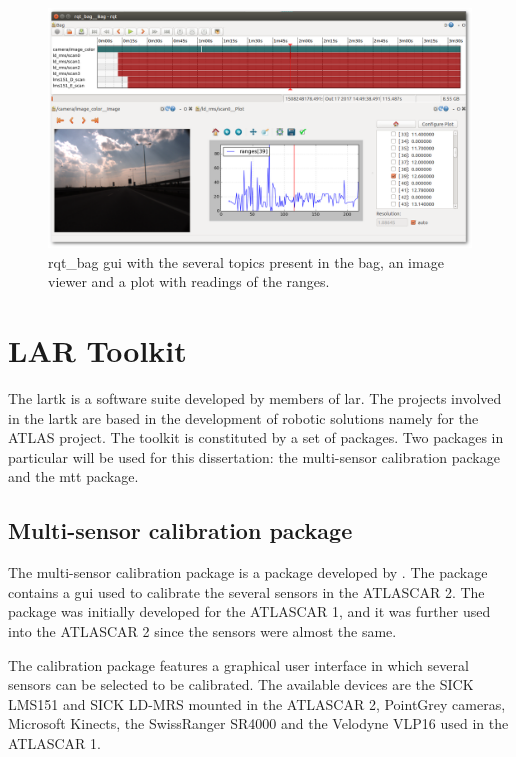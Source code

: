 \begin{figure}[htp]
	\centering
	\includegraphics[width=.99\textwidth]{capexp/imgs/rqt_bag.png}
	\caption{rqt\_bag \gls{gui} with the several topics present in the bag, an image viewer and a plot with readings of the ranges.}
	\label{fig:rqtbag}
\end{figure}


\section{LAR Toolkit}

The \gls{lartk} is a software suite developed by members of \gls{lar}. The projects involved in the \gls{lartk} are based in the development of robotic solutions namely for the ATLAS project. The toolkit is constituted by a set of packages. Two packages in particular will be used for this dissertation: the multi-sensor calibration package and the \gls{mtt} package.

\subsection{Multi-sensor calibration package}

The multi-sensor calibration package is a package developed by \cite{VieiradaSilva2016}. The package contains a \gls{gui} used to calibrate the several sensors in the ATLASCAR 2. The package was initially developed for the ATLASCAR 1, and it was further used into the ATLASCAR 2 since the sensors were almost the same.

The calibration package features a graphical user interface in which several sensors can be selected to be calibrated. The available devices are the SICK LMS151 and SICK LD-MRS mounted in the ATLASCAR 2, PointGrey cameras, Microsoft Kinects, the SwissRanger SR4000 and the Velodyne VLP16 used in the ATLASCAR 1.

